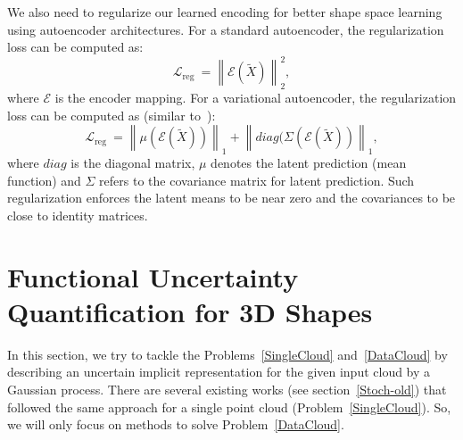     We also need to regularize our learned encoding for better shape space learning using autoencoder architectures. For a standard autoencoder, the regularization loss can be computed as:
    \begin{equation}\label{reg_latent}
        \mathcal{L}_{\text {reg }} = \left\|\mathcal{E}(\tilde{X})\right\|_2^2,
    \end{equation}
    where $\mathcal{E}$ is the encoder mapping. For a variational autoencoder, the  regularization loss can be computed as (similar to~\cite{SAL}):
    \begin{equation}\label{reg_latent}
        \mathcal{L}_{\text {reg }} = \left\|\mu\left(\mathcal{E}(\tilde{X})\right)\right\|_1 +\left\|diag(\Sigma\left(\mathcal{E}(\tilde{X})\right)\right\|_1,
    \end{equation}
    where $diag$ is the diagonal matrix, $\mu$ denotes the latent prediction (mean function) and $\Sigma$ refers to the covariance matrix for latent prediction. Such regularization enforces the latent means to be near zero and the covariances to be close to identity matrices. 

    

\section{Functional Uncertainty Quantification for 3D Shapes}
In this section, we try to tackle the Problems~\ref{SingleCloud} and~\ref{DataCloud} by describing an uncertain implicit representation for the given input cloud by a Gaussian process. There are several existing works (see section~\ref{Stoch-old}) that followed the same approach for a single point cloud (Problem~\ref{SingleCloud}). So, we will only focus on methods to solve Problem~\ref{DataCloud}.






